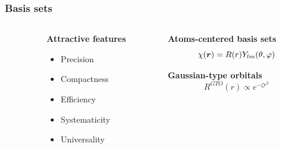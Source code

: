 \begin{frame}
    \frametitle{Basis sets}
    \begin{columns}
    \begin{column}{.10\textwidth}
    \end{column}
    \begin{column}{.30\textwidth}
    \textbf{Attractive features}
    \begin{itemize}
        \item {\color{yellow} Precision}
        \item {\color{yellow} Compactness}
        \item {\color{green} Efficiency}
        \item {\color{yellow} Systematicity}
        \item {\color{red} Universality}
    \end{itemize}
    \end{column}
    \begin{column}{.60\textwidth}
    \centering
    \textbf{Atoms-centered basis sets}
    \begin{equation}
        \nonumber
        \chi(\boldsymbol r) = R(r)Y_{lm}(\theta,\varphi)
    \end{equation}

    \vspace{4.2mm}

    \textbf{Gaussian-type orbitals}
    \begin{equation}
        \nonumber
        R^{GTO}(r) \propto e^{-\zeta r^2}
    \end{equation}
    \end{column}
    \end{columns}

    \vspace{5mm}


\end{frame}
